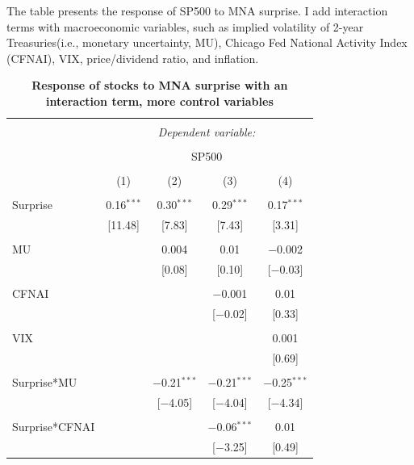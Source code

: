 \documentclass[12pt]{article}
\begin{document}
\begin{table}[!htbp] \centering 
  \caption{\textbf{Response of stocks to MNA surprise with an interaction term, more control variables}} 
  \label{} 
    \begin{flushleft}
    {\medskip\small
 The table presents the response of SP500 to MNA surprise. I add interaction terms with macroeconomic variables, such as implied volatility of 2-year Treasuries(i.e., monetary uncertainty, MU), Chicago Fed National Activity Index (CFNAI), VIX, price/dividend ratio, and inflation.}
    \medskip
    \end{flushleft}
  \small
\begin{tabular}{@{\extracolsep{5pt}}lcccc} 
\\[-1.8ex]\hline 
\hline \\[-1.8ex] 
 & \multicolumn{4}{c}{\textit{Dependent variable:}} \\ 
\cline{2-5} 
\\[-1.8ex] & \multicolumn{4}{c}{SP500} \\ 
\\[-1.8ex] & (1) & (2) & (3) & (4)\\ 
\hline \\[-1.8ex] 
 Surprise & 0.16$^{***}$ & 0.30$^{***}$ & 0.29$^{***}$ & 0.17$^{***}$ \\ 
  & [11.48] & [7.83] & [7.43] & [3.31] \\ 
  & & & & \\ 
 MU &  & 0.004 & 0.01 & $-$0.002 \\ 
  &  & [0.08] & [0.10] & [$-$0.03] \\ 
  & & & & \\ 
 CFNAI &  &  & $-$0.001 & 0.01 \\ 
  &  &  & [$-$0.02] & [0.33] \\ 
  & & & & \\ 
 VIX &  &  &  & 0.001 \\ 
  &  &  &  & [0.69] \\ 
  & & & & \\ 
 Surprise*MU &  & $-$0.21$^{***}$ & $-$0.21$^{***}$ & $-$0.25$^{***}$ \\ 
  &  & [$-$4.05] & [$-$4.04] & [$-$4.34] \\ 
  & & & & \\ 
 Surprise*CFNAI &  &  & $-$0.06$^{***}$ & 0.01 \\ 
  &  &  & [$-$3.25] & [0.49] \\ 

\end{tabular}
\end{table}
\end{document}
